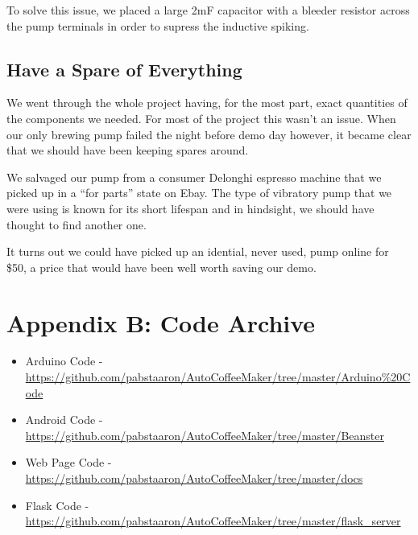 \documentclass[conference]{IEEEtran}
\begin{document}
To solve this issue, we placed a large 2mF capacitor with a bleeder resistor
across the pump terminals in order to supress the inductive spiking.


\subsection{Have a Spare of Everything}
We went through the whole project having, for the most part, exact quantities of
the components we needed. For most of the project this wasn't an issue. When our
only brewing pump failed the night before demo day however, it became clear that
we should have been keeping spares around. 

We salvaged our pump from a consumer Delonghi espresso machine that we picked
up in a ``for parts'' state on Ebay. The type of vibratory pump that we were
using is known for its short lifespan and in hindsight, we should have thought
to find another one. 

It turns out we could have picked up an idential, never used, pump online for
\$50, a price that would have been well worth saving our demo.

\section{Appendix B: Code Archive}

\begin{itemize}
\item Arduino Code -
\url{https://github.com/pabstaaron/AutoCoffeeMaker/tree/master/Arduino\%20Code}
\item Android Code -
\url{https://github.com/pabstaaron/AutoCoffeeMaker/tree/master/Beanster}
\item Web Page Code -
\url{https://github.com/pabstaaron/AutoCoffeeMaker/tree/master/docs}
\item Flask Code -
\url{https://github.com/pabstaaron/AutoCoffeeMaker/tree/master/flask\_server}
\end{itemize}

\end{document}
